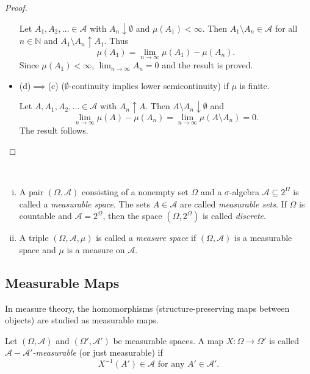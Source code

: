 \begin{proof}
\begin{itemize}
        Let $A_1,A_2,\ldots\in\mathcal{A}$ with $A_n\downarrow\emptyset$ and $\mu(A_1)<\infty$. Then $A_1\setminus A_n\in\mathcal{A}$ for all $n\in\mathbb{N}$ and $A_1\setminus A_n\uparrow A_1$. Thus
        $$\mu(A_1)=\lim_{n\to\infty}\mu(A_1)-\mu(A_n).$$
        Since $\mu(A_1)<\infty$, $\lim_{n\to\infty}A_n=0$ and the result is proved.
        
        \item (d)$\implies$(c) ($\emptyset$-continuity implies lower semicontinuity) if $\mu$ is finite.
        
        Let $A,A_1,A_2,\ldots\in\mathcal{A}$ with $A_n\uparrow A$. Then $A\setminus A_n\downarrow\emptyset$ and
        $$\lim_{n\to\infty}\mu(A)-\mu(A_n)=\lim_{n\to\infty}\mu(A\setminus A_n)=0.$$
        The result follows.
    \end{itemize}
\end{proof}

\begin{definition}
~
\begin{enumerate}[(i)]
    \item A pair $(\Omega,\mathcal{A})$ consisting of a nonempty set $\Omega$ and a $\sigma$-algebra $\mathcal{A}\subseteq2^\Omega$ is called a \textit{measurable space}. The sets $A\in\mathcal{A}$ are called \textit{measurable sets}. If $\Omega$ is countable and $\mathcal{A}=2^\Omega$, then the space $(\Omega,2^\Omega)$ is called \textit{discrete}.
    
    \item A triple $(\Omega,\mathcal{A},\mu)$ is called a \textit{measure space} if $(\Omega,\mathcal{A})$ is a measurable space and $\mu$ is a measure on $\mathcal{A}$.
\end{enumerate}
\end{definition}


\subsection{Measurable Maps}

In measure theory, the homomorphisms (structure-preserving maps between objects) are studied as measurable maps.

\begin{definition}
    Let $(\Omega,\mathcal{A})$ and $(\Omega',\mathcal{A}')$ be measurable spaces. A map $X:\Omega\to\Omega'$ is called \textit{$\mathcal{A}-\mathcal{A}'$-measurable} (or just measurable) if
    $$X^{-1}(A')\in\mathcal{A}\text{ for any }A'\in\mathcal{A}'.$$
\end{definition}

